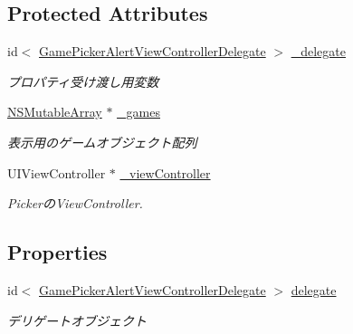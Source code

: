 \subsection*{Protected Attributes}
\begin{DoxyCompactItemize}
\item 
\hypertarget{interface_games_picker_alert_view_controller_af026911aea6de19aa48b9c7a88d1b5bb}{
id$<$ \hyperlink{protocol_game_picker_alert_view_controller_delegate-p}{GamePickerAlertViewControllerDelegate} $>$ \hyperlink{interface_games_picker_alert_view_controller_af026911aea6de19aa48b9c7a88d1b5bb}{\_\-delegate}}
\label{interface_games_picker_alert_view_controller_af026911aea6de19aa48b9c7a88d1b5bb}

\begin{DoxyCompactList}\small\item\em プロパティ受け渡し用変数 \end{DoxyCompactList}\item 
\hypertarget{interface_games_picker_alert_view_controller_a37e891224c952a87ef89d533789b8ab1}{
\hyperlink{class_n_s_mutable_array}{NSMutableArray} $\ast$ \hyperlink{interface_games_picker_alert_view_controller_a37e891224c952a87ef89d533789b8ab1}{\_\-games}}
\label{interface_games_picker_alert_view_controller_a37e891224c952a87ef89d533789b8ab1}

\begin{DoxyCompactList}\small\item\em 表示用のゲームオブジェクト配列 \end{DoxyCompactList}\item 
\hypertarget{interface_games_picker_alert_view_controller_aac01472bff047caa18ab362d9e52788d}{
UIViewController $\ast$ \hyperlink{interface_games_picker_alert_view_controller_aac01472bff047caa18ab362d9e52788d}{\_\-viewController}}
\label{interface_games_picker_alert_view_controller_aac01472bff047caa18ab362d9e52788d}

\begin{DoxyCompactList}\small\item\em PickerのViewController. \end{DoxyCompactList}\end{DoxyCompactItemize}
\subsection*{Properties}
\begin{DoxyCompactItemize}
\item 
\hypertarget{interface_games_picker_alert_view_controller_a1d61c809e7c56216603090071b63bdb0}{
id$<$ \hyperlink{protocol_game_picker_alert_view_controller_delegate-p}{GamePickerAlertViewControllerDelegate} $>$ \hyperlink{interface_games_picker_alert_view_controller_a1d61c809e7c56216603090071b63bdb0}{delegate}}
\label{interface_games_picker_alert_view_controller_a1d61c809e7c56216603090071b63bdb0}

\begin{DoxyCompactList}\small\item\em デリゲートオブジェクト \end{DoxyCompactList}\end{DoxyCompactItemize}


